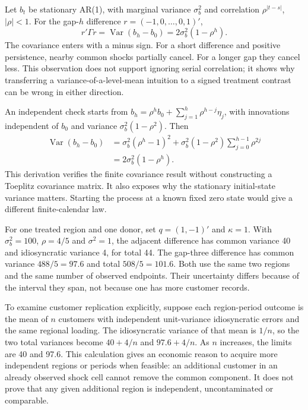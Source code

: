 Let $b_t$ be stationary AR(1), with marginal variance $\sigma_b^2$
and correlation $\rho^{|t-s|}$, $|\rho|<1$. For the gap-$h$
difference $r=(-1,0,\ldots,0,1)'$,
\begin{equation}
 r'\Gamma r
  =\operatorname{Var}(b_h-b_0)
  =2\sigma_b^2(1-\rho^h).
 \label{exec17:s6-gap-variance}
\end{equation}
The covariance enters with a minus sign. For a short difference and
positive persistence, nearby common shocks partially cancel. For a
longer gap they cancel less. This observation does not support ignoring
serial correlation; it shows why transferring a variance-of-a-level-mean
intuition to a signed treatment contrast can be wrong in either direction.

An independent check starts from
$b_h=\rho^hb_0+\sum_{j=1}^h\rho^{h-j}\eta_j$, with innovations
independent of $b_0$ and variance
$\sigma_b^2(1-\rho^2)$. Then
\begin{align}
 \operatorname{Var}(b_h-b_0)
 &=\sigma_b^2(\rho^h-1)^2
   +\sigma_b^2(1-\rho^2)\sum_{j=0}^{h-1}\rho^{2j}\nonumber\\
 &=2\sigma_b^2(1-\rho^h).
 \label{exec17:s6-innovation-check}
\end{align}
This derivation verifies the finite covariance result without constructing
a Toeplitz covariance matrix. It also exposes why the stationary
initial-state variance matters. Starting the process at a known fixed
zero state would give a different finite-calendar law.

For one treated region and one donor, set $q=(1,-1)'$ and
$\kappa=1$. With $\sigma_b^2=100$, $\rho=4/5$ and $\sigma^2=1$,
the adjacent difference has common variance 40 and idiosyncratic variance
4, for total 44. The gap-three difference has common variance
$488/5=97.6$ and total $508/5=101.6$. Both use the same two
regions and the same number of observed endpoints. Their uncertainty
differs because of the interval they span, not because one has more
customer records.~\citep{exec17_s6_math}

To examine customer replication explicitly, suppose each region-period
outcome is the mean of $n$ customers with independent unit-variance
idiosyncratic errors and the same regional loading. The idiosyncratic
variance of that mean is $1/n$, so the two total variances become
$40+4/n$ and $97.6+4/n$. As $n$ increases, the limits are 40
and 97.6. This calculation gives an economic reason to acquire more
independent regions or periods when feasible: an additional customer in
an already observed shock cell cannot remove the common component.
It does not prove that any given additional region is independent,
uncontaminated or comparable.

